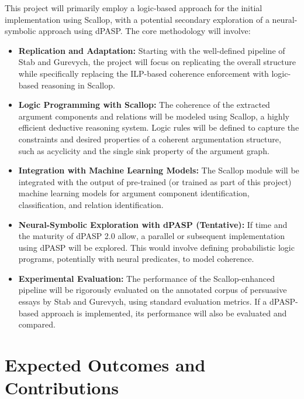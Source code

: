 \documentclass{article}
\begin{document}
This project will primarily employ a logic-based approach for the initial
implementation using Scallop, with a potential secondary exploration of a
neural-symbolic approach using dPASP. The core methodology will involve:

\begin{itemize}
    \item \textbf{Replication and Adaptation:} Starting with the well-defined
    pipeline of Stab and Gurevych, the project will focus on replicating the
    overall structure while specifically replacing the ILP-based coherence
    enforcement with logic-based reasoning in Scallop.

    \item \textbf{Logic Programming with Scallop:} The coherence of the
    extracted argument components and relations will be modeled using Scallop,
    a highly efficient deductive reasoning system. Logic rules will be defined
    to capture the constraints and desired properties of a coherent
    argumentation structure, such as acyclicity and the single sink property
    of the argument graph.

    \item \textbf{Integration with Machine Learning Models:} The Scallop module
    will be integrated with the output of pre-trained (or trained as part of
    this project) machine learning models for argument component
    identification, classification, and relation identification.

    \item \textbf{Neural-Symbolic Exploration with dPASP (Tentative):} If time
    and the maturity of dPASP 2.0 allow, a parallel or subsequent
    implementation using dPASP will be explored. This would involve defining
    probabilistic logic programs, potentially with neural predicates, to model
    coherence.

    \item \textbf{Experimental Evaluation:} The performance of the
    Scallop-enhanced pipeline will be rigorously evaluated on the annotated
    corpus of persuasive essays by Stab and Gurevych, using standard
    evaluation metrics. If a dPASP-based approach is implemented, its
    performance will also be evaluated and compared.
\end{itemize}

\section{Expected Outcomes and Contributions}
\end{document}
